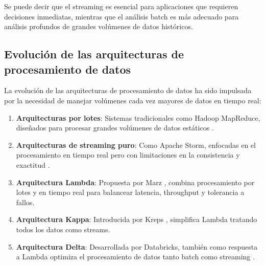 Se puede decir que el streaming es esencial para aplicaciones
que requieren decisiones inmediatas, mientras que el análisis batch es más 
adecuado para análisis profundos de grandes volúmenes de datos históricos.\parencite{stonebraker2005one}
\newpage
\subsection{Evolución de las arquitecturas de procesamiento de datos}

La evolución de las arquitecturas de procesamiento de datos ha sido impulsada por la necesidad de manejar volúmenes cada vez mayores de datos en tiempo real:

\begin{enumerate}
    \item \textbf{Arquitecturas por lotes}: Sistemas tradicionales como Hadoop MapReduce, diseñados para procesar grandes volúmenes de datos estáticos \parencite{dean2008mapreduce}.
    \item \textbf{Arquitecturas de streaming puro}: Como Apache Storm, enfocadas en el procesamiento en tiempo real pero con limitaciones en la consistencia y exactitud \parencite{toshniwal2014storm}.
    \item \textbf{Arquitectura Lambda}: Propuesta por Marz \parencite{marz2011cap}, combina procesamiento por lotes y en tiempo real para balancear latencia, throughput y tolerancia a fallos.
    \item \textbf{Arquitectura Kappa}: Introducida por Kreps \parencite{kreps2014questioning}, simplifica Lambda tratando todos los datos como streams.
    \item \textbf{Arquitectura Delta}: Desarrollada por Databricks, también como respuesta a Lambda optimiza el procesamiento de datos tanto batch como streaming \parencite{deltalake} \parencite{delta}.
\end{enumerate}
\newpage